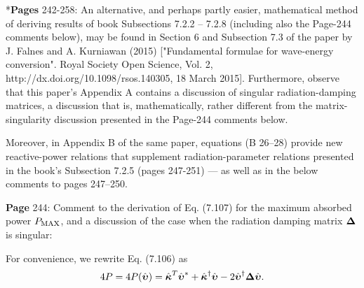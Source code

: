 \documentclass[a4paper,12pt]{article}
\newcommand{\bupsi}{\mbox{\boldmath ${\rm \upsilon}$}}
\newcommand{\bkappa}{\mbox{\boldmath $\rm \kappa$}}
\begin{document}
\vspace{0.3cm} %
 
\vspace{0.4cm} %

\noindent %
*{\bf Pages} 242-258: An alternative, and perhaps partly easier, mathematical method of deriving results of book Subsections 7.2.2 -- 7.2.8 (including also the Page-244 comments below), may be found in Section 6 and Subsection 7.3 of the paper by J. Falnes and A. Kurniawan (2015) ["Fundamental formulae for wave-energy conversion". Royal Society Open Science, Vol. 2, \newline http://dx.doi.org/10.1098/rsos.140305, 18 March 2015]. 
%
Furthermore, observe that this paper's Appendix A contains a discussion of singular radiation-damping matrices, a discussion that is, mathematically, rather different from the matrix-singularity discussion  presented in the Page-244 comments below.

Moreover, in Appendix B of the same paper, equations (B 26--28) provide new reactive-power relations that supplement radiation-parameter relations presented in the book's Subsection 7.2.5 (pages 247-251) --- as well as in the below comments to pages 247--250.
%
\newline  {$\diamondsuit$}  \vspace{0.25cm} %

\noindent %
{\bf Page} 244: Comment to the derivation of Eq. (7.107) for the maximum absorbed power $P_{\rm MAX}$, and a discussion of the case when the radiation damping matrix ${\bf \Delta}$ is singular: 
\vspace{0.2cm}

For convenience, we rewrite Eq. (7.106) as
\vspace{-0.4cm}
\begin{equation}
4P=4P(\hat{\bupsi})=\hat{\bkappa}^T\hat{\bupsi}^*+
	\hat{\bkappa}^\dagger\hat{\bupsi}
	-2\hat{\bupsi}^\dagger {\bf \Delta} \hat{\bupsi}
\nonumber .
\end{equation}
\vspace{-0.8cm}
\end{document}
